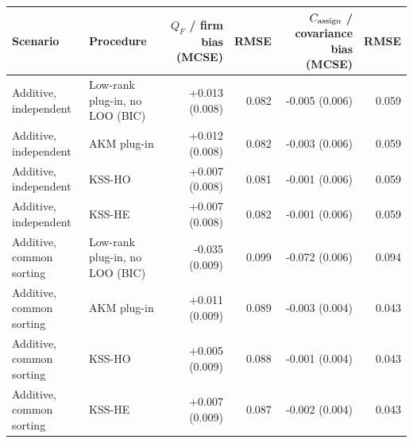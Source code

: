 \begin{tabular}{llrrrr}
\toprule
Scenario & Procedure & $Q_F$ / firm bias (MCSE) & RMSE & $C_{\rm assign}$ / covariance bias (MCSE) & RMSE \\
\midrule
Additive, independent & Low-rank plug-in, no LOO (BIC) & +0.013 (0.008) & 0.082 & -0.005 (0.006) & 0.059 \\
Additive, independent & AKM plug-in & +0.012 (0.008) & 0.082 & -0.003 (0.006) & 0.059 \\
Additive, independent & KSS-HO & +0.007 (0.008) & 0.081 & -0.001 (0.006) & 0.059 \\
Additive, independent & KSS-HE & +0.007 (0.008) & 0.082 & -0.001 (0.006) & 0.059 \\
Additive, common sorting & Low-rank plug-in, no LOO (BIC) & -0.035 (0.009) & 0.099 & -0.072 (0.006) & 0.094 \\
Additive, common sorting & AKM plug-in & +0.011 (0.009) & 0.089 & -0.003 (0.004) & 0.043 \\
Additive, common sorting & KSS-HO & +0.005 (0.009) & 0.088 & -0.001 (0.004) & 0.043 \\
Additive, common sorting & KSS-HE & +0.007 (0.009) & 0.087 & -0.002 (0.004) & 0.043 \\
\bottomrule
\end{tabular}

